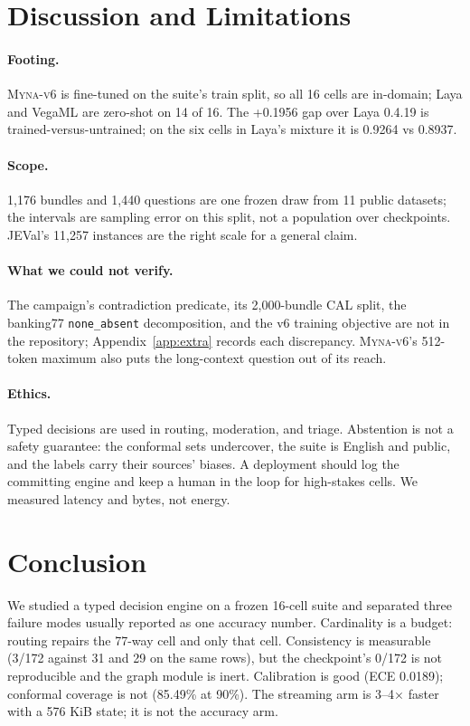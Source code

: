 \documentclass[11pt]{article}
\newcommand{\vsix}{\textsc{Myna-v6}}
\begin{document}
\section{Discussion and Limitations}
\label{sec:limitations}

\paragraph{Footing.}
\vsix{} is fine-tuned on the suite's train split, so all 16 cells are in-domain; Laya and VegaML are zero-shot on 14 of 16. The +0.1956 gap over Laya 0.4.19 is trained-versus-untrained; on the six cells in Laya's mixture it is 0.9264 vs 0.8937.

\paragraph{Scope.}
1{,}176 bundles and 1{,}440 questions are one frozen draw from 11 public datasets; the intervals are sampling error on this split, not a population over checkpoints. JEVal's 11{,}257 instances are the right scale for a general claim.

\paragraph{What we could not verify.}
The campaign's contradiction predicate, its 2{,}000-bundle CAL split, the banking77 \texttt{none\_absent} decomposition, and the v6 training objective are not in the repository; Appendix~\ref{app:extra} records each discrepancy. \vsix{}'s 512-token maximum also puts the long-context question out of its reach.

\paragraph{Ethics.}
Typed decisions are used in routing, moderation, and triage. Abstention is not a safety guarantee: the conformal sets undercover, the suite is English and public, and the labels carry their sources' biases. A deployment should log the committing engine and keep a human in the loop for high-stakes cells. We measured latency and bytes, not energy.

\section{Conclusion}
\label{sec:conclusion}

We studied a typed decision engine on a frozen 16-cell suite and separated three failure modes usually reported as one accuracy number. Cardinality is a budget: routing repairs the 77-way cell and only that cell. Consistency is measurable (3/172 against 31 and 29 on the same rows), but the checkpoint's 0/172 is not reproducible and the graph module is inert. Calibration is good (ECE 0.0189); conformal coverage is not (85.49\% at 90\%). The streaming arm is 3--4$\times$ faster with a 576 KiB state; it is not the accuracy arm.
\end{document}
